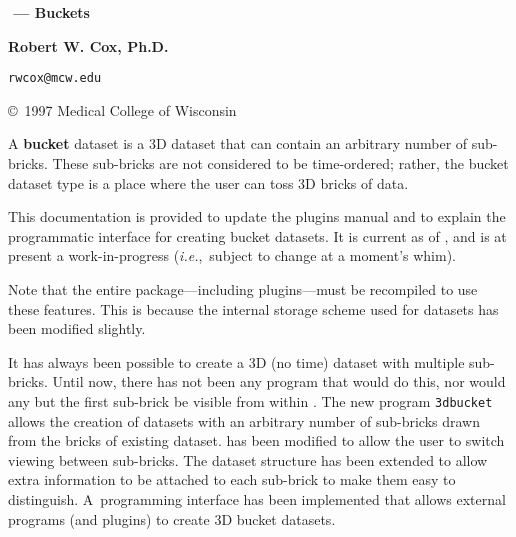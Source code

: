 \vspace*{0.4in}
\centerline{\Large\bf\boldmath \MCW$\!$ \afnit --- Buckets}\vspace{1ex}
\centerline{\large\bf Robert W. Cox, Ph.D.}\vspace{0.4ex}
\centerline{\tt rwcox@mcw.edu}\vspace{0.2ex}
\centerline{\copyright\ 1997 Medical College of Wisconsin}

\vspace{5ex}
\centerline{}
\vspace{6ex}

\noindent
A {\bf bucket} dataset is a 3D dataset that can contain an
arbitrary number of sub-bricks.  These sub-bricks are not
considered to be time-ordered; rather, the bucket dataset type
is a place where the user can toss 3D bricks of data.

This documentation is provided to update the \afnit plugins
manual and to explain the programmatic interface for creating
bucket datasets.  It is current as of , and
is at present a work-in-progress ({\it i.e.},~subject to change
at a moment's whim).

Note that the entire \mcwafni package---including plugins---must be recompiled
to use these features.  This is because the internal
storage scheme used for datasets has been modified slightly.

\tableofcontents
\newpage
It has always been possible to create a 3D (no time) dataset with
multiple sub-bricks.  Until now, there has not been any program
that would do this, nor would any but the first sub-brick be
visible from within \afni.
The new program {\tt 3dbucket} allows the creation of
datasets with an arbitrary number of sub-bricks drawn from
the bricks of existing dataset.  \afnit has been modified
to allow the user to switch viewing between sub-bricks.
The dataset structure has been extended to allow extra
information to be attached to each sub-brick to make
them easy to distinguish.  A~programming interface has
been implemented that allows external programs (and plugins)
to create 3D bucket datasets.

